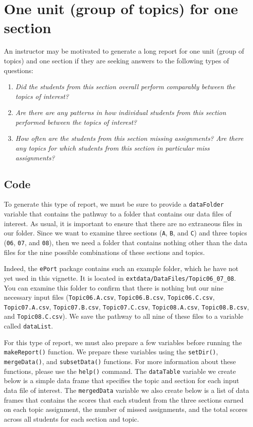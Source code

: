 \documentclass[11pt,a4paper,oldfontcommands,openany]{memoir}
\numberwithin{equation}{section} %
\begin{document}
\section{One unit (group of topics) for one section}

An instructor may be motivated to generate a long report for one unit (group of topics) and one section if they are seeking answers to the following types of questions:

\begin{enumerate}
\item \textit{Did the students from this section overall perform comparably between the topics of interest?}
\item \textit{Are there are any patterns in how individual students from this section performed between the topics of interest?}
\item \textit{How often are the students from this section missing assignments? Are there any topics for which students from this section in particular miss assignments?}
\end{enumerate}

\subsection{Code}

To generate this type of report, we must be sure to provide a \texttt{dataFolder} variable that contains the pathway to a folder that contains our data files of interest. As usual, it is important to ensure that there are no extraneous files in our folder. Since we want to examine three sections (\texttt{A}, \texttt{B}, and \texttt{C}) and three topics (\texttt{06}, \texttt{07}, and \texttt{08}), then we need a folder that contains nothing other than the data files for the nine possible combinations of these sections and topics.

Indeed, the \texttt{ePort} package contains such an example folder, which he have not yet used in this vignette. It is located in \texttt{extdata/DataFiles/Topic06\_07\_08}. You can examine this folder to confirm that there is nothing but our nine necessary input files (\texttt{Topic06.A.csv}, \texttt{Topic06.B.csv}, \texttt{Topic06.C.csv}, \texttt{Topic07.A.csv}, \texttt{Topic07.B.csv}, \texttt{Topic07.C.csv}, \texttt{Topic08.A.csv}, \texttt{Topic08.B.csv}, and \texttt{Topic08.C.csv}). We save the pathway to all nine of these files to a variable called \texttt{dataList}.

For this type of report, we must also prepare a few variables before running the \texttt{makeReport()} function. We prepare these variables using the \texttt{setDir()}, \texttt{mergeData()}, and \texttt{subsetData()} functions. For more information about these functions, please use the \texttt{help()} command. The \texttt{dataTable} variable we create below is a simple data frame that specifies the topic and section for each input data file of interest. The \texttt{mergedData} variable we also create below is a list of data frames that contains the scores that each student from the three sections earned on each topic assignment, the number of missed assignments, and the total scores across all students for each section and topic.
\end{document}
